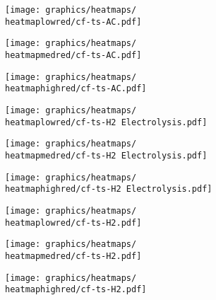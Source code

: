 \begin{figure}[h]
    \centering
        \begin{subfigure}[h]{0.33\textwidth}
            \centering
        \texttt{[image: graphics/heatmaps/\\heatmaplowred/cf-ts-AC.pdf]}
    \end{subfigure}
    \begin{subfigure}[h]{0.33\textwidth}
        \centering
        \texttt{[image: graphics/heatmaps/\\heatmapmedred/cf-ts-AC.pdf]}
    \end{subfigure}
    \begin{subfigure}[h]{0.33\textwidth}
        \centering
        \texttt{[image: graphics/heatmaps/\\heatmaphighred/cf-ts-AC.pdf]}
    \end{subfigure}


    \begin{subfigure}[h]{0.33\textwidth}
        \centering
        \texttt{[image: graphics/heatmaps/\\heatmaplowred/cf-ts-H2 Electrolysis.pdf]}
    \end{subfigure}
    \begin{subfigure}[h]{0.33\textwidth}
        \centering
        \texttt{[image: graphics/heatmaps/\\heatmapmedred/cf-ts-H2 Electrolysis.pdf]}
    \end{subfigure}
    \begin{subfigure}[h]{0.33\textwidth}
        \centering
        \texttt{[image: graphics/heatmaps/\\heatmaphighred/cf-ts-H2 Electrolysis.pdf]}
    \end{subfigure}

    \begin{subfigure}[h]{0.33\textwidth}
        \centering
        \texttt{[image: graphics/heatmaps/\\heatmaplowred/cf-ts-H2.pdf]}
    \end{subfigure}
    \begin{subfigure}[h]{0.33\textwidth}
        \centering
        \texttt{[image: graphics/heatmaps/\\heatmapmedred/cf-ts-H2.pdf]}
    \end{subfigure}
    \begin{subfigure}[h]{0.33\textwidth}
        \centering
        \texttt{[image: graphics/heatmaps/\\heatmaphighred/cf-ts-H2.pdf]}
        
    \end{subfigure}



\end{figure}
